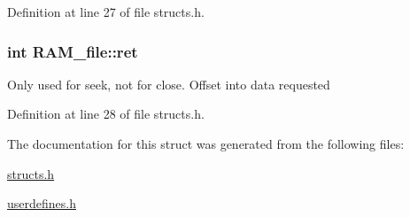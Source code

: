 Definition at line 27 of file structs.\-h.

\hypertarget{struct_r_a_m__file_a9f619fbe5222d9f0a30e27db9c263c78}{
\subsubsection[{ret}]{\setlength{\rightskip}{0pt plus 5cm}int R\-A\-M\-\_\-file\-::ret}}\label{struct_r_a_m__file_a9f619fbe5222d9f0a30e27db9c263c78}
Only used for seek, not for close. Offset into data requested 

Definition at line 28 of file structs.\-h.



The documentation for this struct was generated from the following files\-:\begin{DoxyCompactItemize}
\item 
\hyperlink{structs_8h}{structs.\-h}\item 
\hyperlink{userdefines_8h}{userdefines.\-h}\end{DoxyCompactItemize}
